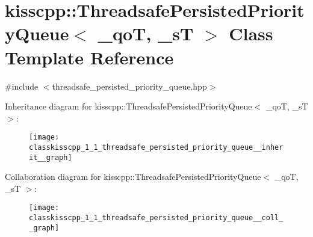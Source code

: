 \hypertarget{classkisscpp_1_1_threadsafe_persisted_priority_queue}{\section{kisscpp\-:\-:Threadsafe\-Persisted\-Priority\-Queue$<$ \-\_\-qo\-T, \-\_\-s\-T $>$ Class Template Reference}
\label{classkisscpp_1_1_threadsafe_persisted_priority_queue}
}


{\ttfamily \#include $<$threadsafe\-\_\-persisted\-\_\-priority\-\_\-queue.\-hpp$>$}



Inheritance diagram for kisscpp\-:\-:Threadsafe\-Persisted\-Priority\-Queue$<$ \-\_\-qo\-T, \-\_\-s\-T $>$\-:\nopagebreak
\begin{figure}[H]
\begin{center}
\leavevmode
\texttt{[image: classkisscpp\_1\_1\_threadsafe\_persisted\_priority\_queue\_\_inherit\_\_graph]}
\end{center}
\end{figure}


Collaboration diagram for kisscpp\-:\-:Threadsafe\-Persisted\-Priority\-Queue$<$ \-\_\-qo\-T, \-\_\-s\-T $>$\-:\nopagebreak
\begin{figure}[H]
\begin{center}
\leavevmode
\texttt{[image: classkisscpp\_1\_1\_threadsafe\_persisted\_priority\_queue\_\_coll\_\_graph]}
\end{center}
\end{figure}
